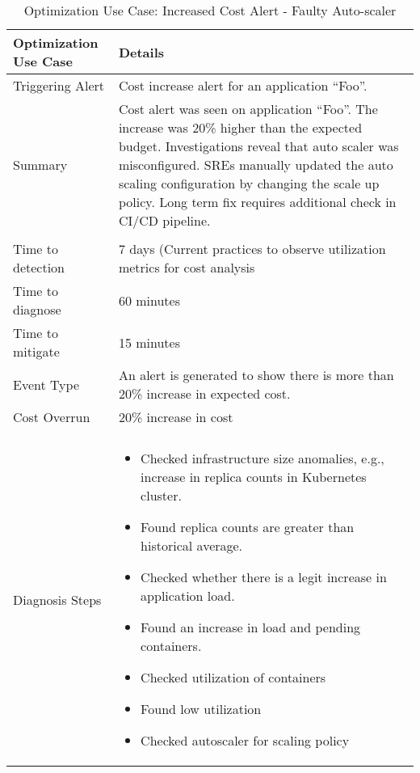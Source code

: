 \begin{table*}[ht!]
    \small
    \centering
    \begin{threeparttable}
        \caption{Optimization Use Case: Increased Cost Alert - Faulty Auto-scaler}
        \label{tab:optimization_use_case_autoscaler}
        \begin{tabular}{m{}m{}}
            \toprule
            \textbf{Optimization Use Case} & \textbf{Details} \\
            \midrule
            Triggering Alert & Cost increase alert for an application “Foo”.  \\
            Summary & Cost alert was seen on application “Foo”. The increase was 20\% higher than the expected budget. Investigations reveal that auto scaler was misconfigured. SREs manually updated the auto scaling configuration by changing the scale up policy. Long term fix requires additional check in CI/CD pipeline.  \\ \\
            Time to detection & 7 days (Current practices to observe utilization metrics for cost analysis  \\
            Time to diagnose & 60 minutes \\
            Time to mitigate & 15 minutes \\
            Event Type & An alert is generated to show there is more than 20\% increase in expected cost.\\
            Cost Overrun & 20\% increase in cost\\ \\
            Diagnosis Steps & 
            \begin{itemize}[left=0pt, topsep=0pt, partopsep=0pt, itemsep=0pt, parsep=0pt]
                \item Checked infrastructure size anomalies, e.g., increase in replica counts in Kubernetes cluster.
                \item Found replica counts are greater than historical average.
                \item Checked whether there is a legit increase in application load.
                \item Found an increase in load and pending containers.
                \item  Checked utilization of containers
                \item Found low utilization
                \item Checked autoscaler for scaling policy

\end{itemize}
\end{tabular}
\end{threeparttable}
\end{table*}
